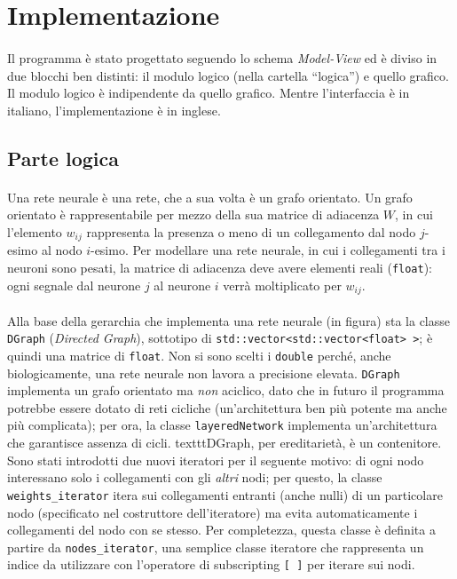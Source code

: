 \documentclass{article}
\begin{document}



\section{Implementazione}

\paragraph{} Il programma è stato progettato seguendo lo schema \textit{Model-View} ed è diviso in due blocchi ben distinti: il modulo logico (nella cartella “logica”) e quello grafico. Il modulo logico è indipendente da quello grafico. Mentre l'interfaccia è in italiano, l'implementazione è in inglese.

\subsection{Parte logica}

\paragraph{} Una rete neurale è una rete, che a sua volta è un grafo orientato. Un grafo orientato è rappresentabile per mezzo della sua matrice di adiacenza $W$, in cui l'elemento $w_{ij}$ rappresenta la presenza o meno di un collegamento dal nodo $j$-esimo al nodo $i$-esimo. Per modellare una rete neurale, in cui i collegamenti tra i neuroni sono pesati, la matrice di adiacenza deve avere elementi reali (\texttt{float}): ogni segnale dal neurone $j$ al neurone $i$ verrà moltiplicato per $w_{ij}$.

\paragraph{} Alla base della gerarchia che implementa una rete neurale (in figura) sta la classe \texttt{DGraph} (\emph{Directed Graph}), sottotipo di \texttt{std::vector<std::vector<float> >}; è quindi una matrice di \texttt{float}. Non si sono scelti i \texttt{double} perché, anche biologicamente, una rete neurale non lavora a precisione elevata. \texttt{DGraph} implementa un grafo orientato ma \emph{non} aciclico, dato che in futuro il programma potrebbe essere dotato di reti cicliche (un'architettura ben più potente ma anche più complicata); per ora, la classe \texttt{layeredNetwork} implementa un'architettura che garantisce assenza di cicli. texttt{DGraph}, per ereditarietà, è un contenitore. Sono stati introdotti due nuovi iteratori per il seguente motivo: di ogni nodo interessano solo i collegamenti con gli \emph{altri} nodi; per questo, la classe \texttt{weights\_iterator} itera sui collegamenti entranti (anche nulli) di un particolare nodo (specificato nel costruttore dell'iteratore) ma evita automaticamente i collegamenti del nodo con se stesso. Per completezza, questa classe è definita a partire da \texttt{nodes\_iterator}, una semplice classe iteratore che rappresenta un indice da utilizzare con l'operatore di subscripting \texttt{[ ]} per iterare sui nodi.
\end{document}
